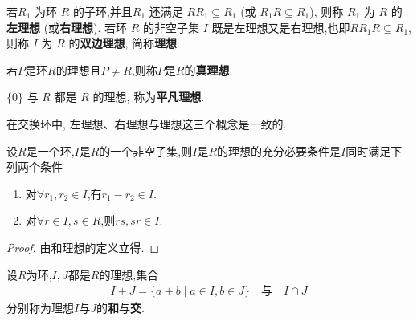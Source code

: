 \documentclass[../../main.tex]{subfiles}%
\begin{document}
\begin{definition}
若\( R_1 \) 为环 \( R \) 的子环,并且\( R_1 \) 还满足 \( RR_1 \subseteq R_1 \) (或 \( R_1R \subseteq R_1 \)), 则称 \( R_1 \) 为 \( R \) 的\textbf{左理想} (或\textbf{右理想}). 若环 \( R \) 的非空子集 \( I \) 既是左理想又是右理想,也即$RR_1R\subseteq R_1$,则称 \( I \) 为 \( R \) 的\textbf{双边理想}, 简称\textbf{理想}.

若$P$是环$R$的理想且$P\neq R$,则称$P$是$R$的\textbf{真理想}.

\( \{0\} \) 与 \( R \) 都是 \( R \) 的理想, 称为\textbf{平凡理想}.
\end{definition}
\begin{remark}
在交换环中, 左理想、右理想与理想这三个概念是一致的.
\end{remark}

\begin{theorem}\label{theorem:环的理想的充要条件}
设$R$是一个环,$I$是$R$的一个非空子集,则$I$是$R$的理想的充分必要条件是$I$同时满足下列两个条件
\begin{enumerate}[(1)]
\item 对$\forall r_1,r_2\in I$,有$r_1-r_2\in I$.

\item 对$\forall r\in I,s\in R$,则$rs,sr\in I$.
\end{enumerate}
\end{theorem}
\begin{proof}

由和理想的定义立得.

\end{proof}

\begin{definition}
设$R$为环,$I,J$都是$R$的理想,集合
\begin{align*}
I+J = \{a+b \mid a \in I, b \in J\} \quad \text{与} \quad I\cap J
\end{align*}
分别称为理想$I$与$J$的\textbf{和}与\textbf{交}.
\end{definition}
\end{document}
